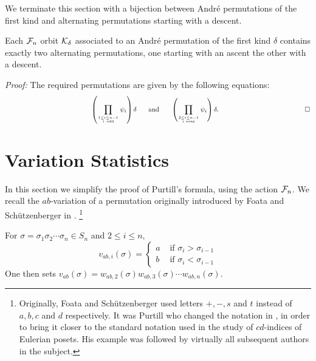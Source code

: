 We terminate this section with a bijection between Andr\'e permutations
of the first kind and alternating permutations starting with a descent.
\begin{prop}
Each ${\cal F}_n$ orbit ${\cal K}_\delta$ associated to an Andr\'e
permutation of the first kind $\delta$ contains exactly two alternating
permutations, one starting with an ascent the other with a descent.
\end{prop}
{\noindent \em Proof:} The required permutations are given by the following equations:
$$ \hspace*{4.57 cm}
 \left(\prod_{{{1 \le i \le n-1}\atop {i {\ \rm odd}}}} \psi_i 
\right )\delta
\hspace{.2 in}
\mbox{ and }
\hspace{.2 in} \left(\prod_{{2 \le i \le n-1}\atop{i {\ \rm even}}} \psi_i 
\right)\delta. \hspace*{4.57 cm} \Box
$$

\section{Variation Statistics}
\label{s_var}

In this section we simplify the proof of Purtill's formula, using the
action ${\cal F}_n$. We recall the $ab$-variation
of a permutation originally introduced by Foata and Sch\"utzenberger in
\cite{Foata-Schut2}. \footnote{Originally, Foata and Sch\"utzenberger
used letters $+,-,s$ and $t$ instead of $a,b,c$ and $d$
respectively. It was Purtill who changed the notation in \cite{pur}, in
order to bring it closer to the standard notation used in the study of
$cd$-indices of Eulerian posets. His example was followed by virtually
all subsequent authors in the subject.}

For $\sigma = \sigma_1\sigma_2\cdots\sigma_n \in S_n$ and
$2 \le i \le n$,
$$
v_{ab,i}(\sigma) = 
\left\{\begin{array}{lr}
a & \mbox{ if } \sigma_i > \sigma_{i-1}  \\
b & \mbox{ if } \sigma_i < \sigma_{i-1} 
\end{array}\right.
$$
One then sets $v_{ab}(\sigma) = w_{ab,2}(\sigma)w_{ab,3}(\sigma)\cdots w_{ab,n}(\sigma)$.


